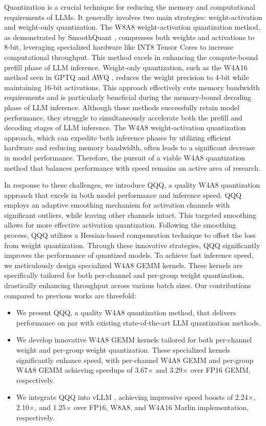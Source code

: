 Quantization is a crucial technique for reducing the memory and computational requirements of LLMs. It generally involves two main strategies: weight-activation and weight-only quantization. The W8A8 weight-activation quantization method, as demonstrated by SmoothQuant \citep{xiao2023smoothquant}, compresses both weights and activations to 8-bit, leveraging specialized hardware like INT8 Tensor Cores to increase computational throughput. This method excels in enhancing the compute-bound prefill phase of LLM inference.
Weight-only quantization, such as the W4A16 method seen in GPTQ \citep{frantar2022gptq} and AWQ \citep{lin2023awq}, reduces the weight precision to 4-bit while maintaining 16-bit activations. This approach effectively cuts memory bandwidth requirements and is particularly beneficial during the memory-bound decoding phase of LLM inference.
Although these methods successfully retain model performance, they struggle to simultaneously accelerate both the prefill and decoding stages of LLM inference. The W4A8 weight-activation quantization approach, which can expedite both inference phases by utilizing efficient hardware and reducing memory bandwidth, often leads to a significant decrease in model performance.
Therefore, the pursuit of a viable W4A8 quantization method that balances performance with speed remains an active area of research.

In response to these challenges, we introduce QQQ, a quality W4A8 quantization approach that excels in both model performance and inference speed. QQQ employs an adaptive smoothing mechanism for activation channels with significant outliers, while leaving other channels intact. This targeted smoothing allows for more effective activation quantization. Following the smoothing process, QQQ utilizes a Hessian-based compensation technique to offset the loss from weight quantization. Through these innovative strategies, QQQ significantly improves the performance of quantized models.
To achieve fast inference speed, we meticulously design specialized W4A8 GEMM kernels. These kernels are specifically tailored for both per-channel and per-group weight quantization, drastically enhancing throughput across various batch sizes.
Our contributions compared to previous works are threefold:

\begin{itemize}
\item
We present QQQ, a quality W4A8 quantization method, that delivers performance on par with existing state-of-the-art LLM quantization methods.
\item 
We develop innovative W4A8 GEMM kernels tailored for both per-channel weight and per-group weight quantization. These specialized kernels significantly enhance speed, with per-channel W4A8 GEMM and per-group W4A8 GEMM achieving speedups of 3.67$\times$ and 3.29$\times$ over FP16 GEMM, respectively.
\item 
We integrate QQQ into vLLM \citep{kwon2023efficient}, achieving impressive speed boosts of 2.24$\times$, 2.10$\times$, and 1.25$\times$ over FP16, W8A8, and W4A16 Marlin \citep{frantar2024marlin} implementation, respectively.
\end{itemize}

